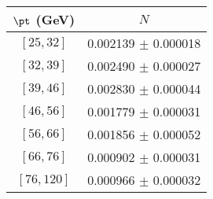 \begin{tabular}{c||c}
$\pt$ (GeV) & $N$  \\
\hline
$[25, 32]$ & 0.002139 $\pm$ 0.000018\\
$[32, 39]$ & 0.002490 $\pm$ 0.000027\\
$[39, 46]$ & 0.002830 $\pm$ 0.000044\\
$[46, 56]$ & 0.001779 $\pm$ 0.000031\\
$[56, 66]$ & 0.001856 $\pm$ 0.000052\\
$[66, 76]$ & 0.000902 $\pm$ 0.000031\\
$[76, 120]$ & 0.000966 $\pm$ 0.000032\\
\end{tabular}
